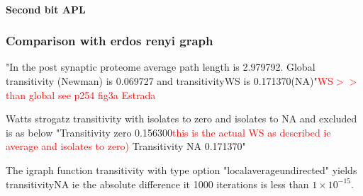 
\paragraph{Second bit APL}

\subsubsection{Comparison with erdos renyi graph}
"In the post synaptic proteome average path length is 2.979792. Global transitivity (Newman) is 0.069727 and transitivityWS is 0.171370(NA)"\textcolor{red}{WS$>>$ than global see p254 fig3a Estrada}

Watts strogatz transitivity with isolates to zero and isolates to NA and excluded is as below
"Transitivity zero 0.156300\textcolor{red}{this is the actual WS as described ie average and isolates to zero)}   Transitivity NA 0.171370"

The igraph function transitivity with type option "localaverageundirected" yields transitivityNA ie the absolute difference it 1000 iterations is less than $1\times10^{-15}$.

